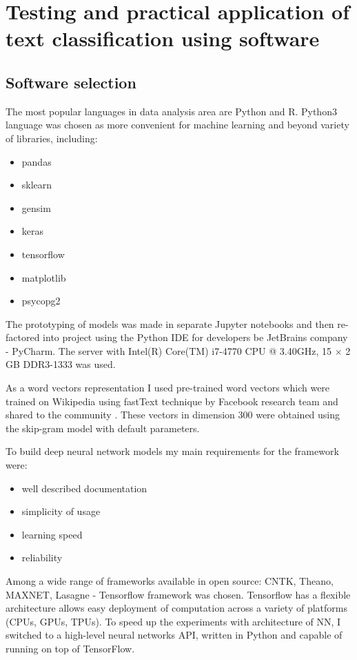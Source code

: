 \chapter{Testing and practical application of text classification using software} \label{chapt3}
\section{Software selection} \label{sect3_1}

The most popular languages in data analysis area are Python and R.
Python3 language was chosen as more convenient for machine learning and beyond variety of libraries, including:

\begin{itemize}
	\item pandas
	\item sklearn
	\item gensim
	\item keras
	\item tensorflow
	\item matplotlib
	\item psycopg2
\end{itemize}

The prototyping of models was made in separate Jupyter notebooks and then re-factored into 
project using the Python IDE for developers be JetBrains company - PyCharm. 
The server with  Intel(R) Core(TM) i7-4770 CPU @ 3.40GHz, 15 $\times$ 2 GB DDR3-1333 was used. 

As a word vectors representation I used pre-trained word vectors which were trained on Wikipedia using fastText technique by Facebook research team and shared to the community \cite{fasttext}. These vectors in dimension 300 were obtained using the skip-gram model with default parameters.

To build deep neural network models my main requirements for the framework were:
\begin{itemize}
	\item well described documentation
	\item simplicity of usage
	\item learning speed
	\item reliability
\end{itemize}

Among a wide range of frameworks available in open source: 
CNTK, Theano, MAXNET, Lasagne - Tensorflow framework was chosen. 
Tensorflow has a flexible architecture allows easy deployment of computation across a variety of platforms (CPUs, GPUs, TPUs). To speed up the experiments with architecture of NN, I switched to a high-level neural networks API, written in Python and capable of running on top of TensorFlow. 


